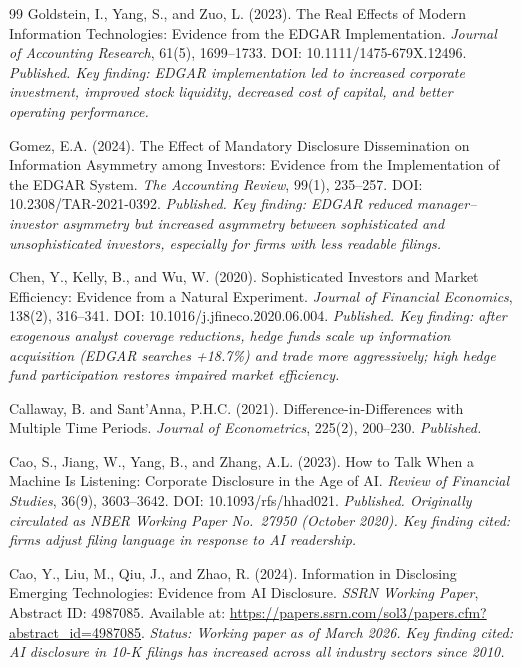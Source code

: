\documentclass[12pt,a4paper]{article}
\begin{document}
\begin{thebibliography}{99}
Goldstein, I., Yang, S., and Zuo, L. (2023).
\newblock The Real Effects of Modern Information Technologies: Evidence from the EDGAR Implementation.
\newblock \emph{Journal of Accounting Research}, 61(5), 1699--1733.
\newblock DOI: 10.1111/1475-679X.12496.
\newblock \textit{Published. Key finding: EDGAR implementation led to increased corporate investment, improved stock liquidity, decreased cost of capital, and better operating performance.}

Gomez, E.A. (2024).
\newblock The Effect of Mandatory Disclosure Dissemination on Information Asymmetry among Investors: Evidence from the Implementation of the EDGAR System.
\newblock \emph{The Accounting Review}, 99(1), 235--257.
\newblock DOI: 10.2308/TAR-2021-0392.
\newblock \textit{Published. Key finding: EDGAR reduced manager--investor asymmetry but increased asymmetry between sophisticated and unsophisticated investors, especially for firms with less readable filings.}

Chen, Y., Kelly, B., and Wu, W. (2020).
\newblock Sophisticated Investors and Market Efficiency: Evidence from a Natural Experiment.
\newblock \emph{Journal of Financial Economics}, 138(2), 316--341.
\newblock DOI: 10.1016/j.jfineco.2020.06.004.
\newblock \textit{Published. Key finding: after exogenous analyst coverage reductions, hedge funds scale up information acquisition (EDGAR searches +18.7\%) and trade more aggressively; high hedge fund participation restores impaired market efficiency.}

Callaway, B. and Sant'Anna, P.H.C. (2021).
\newblock Difference-in-Differences with Multiple Time Periods.
\newblock \emph{Journal of Econometrics}, 225(2), 200--230.
\newblock \textit{Published.}

Cao, S., Jiang, W., Yang, B., and Zhang, A.L. (2023).
\newblock How to Talk When a Machine Is Listening: Corporate Disclosure in the Age of AI.
\newblock \emph{Review of Financial Studies}, 36(9), 3603--3642.
\newblock DOI: 10.1093/rfs/hhad021.
\newblock \textit{Published. Originally circulated as NBER Working Paper No.~27950 (October 2020). Key finding cited: firms adjust filing language in response to AI readership.}

Cao, Y., Liu, M., Qiu, J., and Zhao, R. (2024).
\newblock Information in Disclosing Emerging Technologies: Evidence from AI Disclosure.
\newblock \emph{SSRN Working Paper}, Abstract ID: 4987085.
\newblock Available at: \url{https://papers.ssrn.com/sol3/papers.cfm?abstract_id=4987085}.
\newblock \textit{Status: Working paper as of March 2026. Key finding cited: AI disclosure in 10-K filings has increased across all industry sectors since 2010.}


\end{thebibliography}
\end{document}
